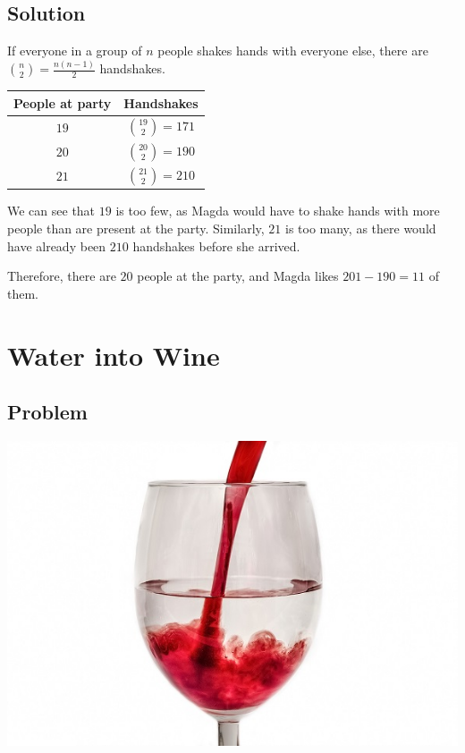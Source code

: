 \documentclass{book}
\begin{document}
\subsection{Solution}
\setlength{\parskip}{6pt}
If everyone in a group of \(n\) people shakes hands with everyone else, there are \( {{n}\choose{2}}= \frac{n(n-1)}{2}\) handshakes.
\renewcommand{\arraystretch}{1.5}
\begin{center}
\begin{tabular}{ |c|c| }

 \hline
 People at party & Handshakes \\
 \hline
 \(19\) & \({{19}\choose{2}}=171\) \\
 \(20\) & \({{20}\choose{2}}=190\) \\
 \(21\) & \({{21}\choose{2}}=210\) \\
 \hline
\end{tabular}
\end{center}

We can see that \(19\) is too few, as Magda would have to shake hands with more people than are present at the party. Similarly, \(21\) is too many, as there would have already been \(210\) handshakes before she arrived.

Therefore, there are \(20\) people at the party, and Magda likes \(201-190=\boxed{11}\) of them.

\newpage

\section{Water into Wine}
\subsection{Problem}
\begin{center}
\includegraphics{wine}
\end{center}
\end{document}
